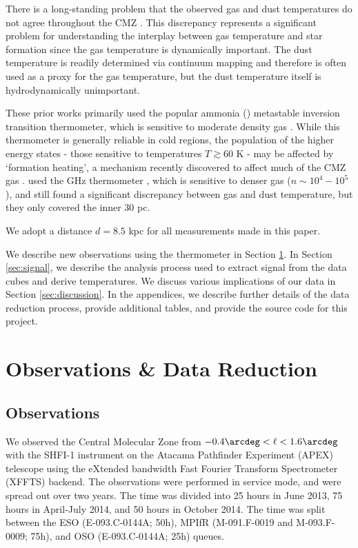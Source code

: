 There is a long-standing problem that the observed gas and dust temperatures do
not agree throughout the CMZ
\citep{Guesten1981a,Ao2013a,Ott2014a,Molinari2011a}.  This discrepancy
represents a significant problem for understanding the interplay between gas
temperature and star formation since the gas temperature is dynamically
important.  The dust temperature is readily determined via continuum mapping
and therefore is often used as a proxy for the gas temperature, but the dust
temperature itself is hydrodynamically unimportant.

These prior works primarily used the popular ammonia (\ammonia) metastable
inversion transition thermometer, which is sensitive to moderate density gas
\citep[$n(\hh) \sim 10^3-10^4$ \percc][]{Shirley2015a}.  While this thermometer is
generally reliable in cold regions, the population of the higher energy states
- those sensitive to temperatures $T\gtrsim60$ K - may be affected by
`formation heating', a mechanism recently discovered to affect much of the CMZ
gas \citep[][]{Lis2014a,Mills2013a}.  \citet{Ao2013a} used the  GHz
thermometer \citep{Mangum1993a}, which is sensitive to denser gas
($n\sim10^4-10^5$ \percc), and still found a significant discrepancy between
gas and dust temperature, but they only
covered the inner 30 pc.

We adopt a distance $d=8.5$ kpc for all measurements made in this paper.

We describe new observations using the \para thermometer in Section
\ref{sec:observations}.  In Section \ref{sec:signal}, we describe the analysis
process used to extract signal from the data cubes and derive temperatures.  We
discuss various implications of our data in Section \ref{sec:discussion}.  In
the appendices, we describe further details of the data reduction process,
provide additional tables, and provide the source code for this project.


\section{Observations \& Data Reduction}
\label{sec:observations}

\subsection{Observations}
We observed the Central Molecular Zone from $-0.4\arcdeg < \ell < 1.6\arcdeg$ with the SHFI-1
instrument \citep{Vassilev2008a} on the Atacama Pathfinder Experiment (APEX)
telescope using the eXtended bandwidth Fast Fourier Transform Spectrometer
(XFFTS) backend.
The observations were performed in service mode, and were spread out over two
years.  The time was divided into 25 hours in June 2013, 75 hours in April-July
2014, and 50 hours in October 2014.  The time was split between the ESO
(E-093.C-0144A; 50h), MPIfR (M-091.F-0019 and M-093.F-0009; 75h), and OSO
(E-093.C-0144A; 25h) queues.

